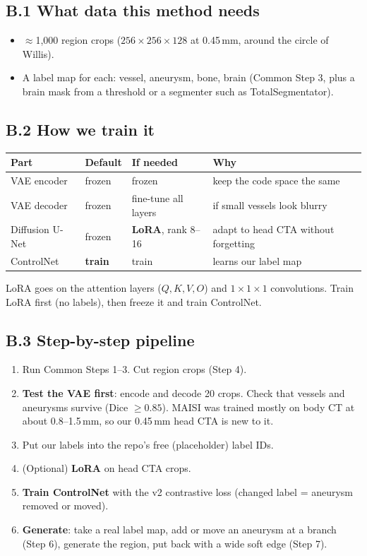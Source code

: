 \documentclass[11pt,a4paper,oneside]{report}
\begin{document}
\subsection*{B.1 What data this method needs}
\begin{itemize}
  \item $\approx$1{,}000 region crops ($256\times256\times128$ at 0.45\,mm, around the circle of Willis).
  \item A label map for each: vessel, aneurysm, bone, brain (Common Step 3, plus a brain mask from a threshold or a segmenter such as TotalSegmentator).
\end{itemize}

\subsection*{B.2 How we train it}
\begin{center}
\small
\begin{tabularx}{\linewidth}{lllX}
\toprule
\textbf{Part} & \textbf{Default} & \textbf{If needed} & \textbf{Why} \\
\midrule
VAE encoder & frozen & frozen & keep the code space the same \\
VAE decoder & frozen & fine-tune all layers & if small vessels look blurry \\
Diffusion U-Net & frozen & \textbf{LoRA}, rank 8--16 & adapt to head CTA without forgetting \\
ControlNet & \textbf{train} & train & learns our label map \\
\bottomrule
\end{tabularx}
\end{center}
LoRA goes on the attention layers ($Q,K,V,O$) and $1\times1\times1$ convolutions. Train LoRA first (no labels), then freeze it and train ControlNet.

\subsection*{B.3 Step-by-step pipeline}
\begin{enumerate}
  \item Run Common Steps 1--3. Cut region crops (Step 4).
  \item \textbf{Test the VAE first}: encode and decode 20 crops. Check that vessels and aneurysms survive (Dice $\ge0.85$). MAISI was trained mostly on body CT at about 0.8--1.5\,mm, so our 0.45\,mm head CTA is new to it.
  \item Put our labels into the repo's free (placeholder) label IDs.
  \item (Optional) \textbf{LoRA} on head CTA crops.
  \item \textbf{Train ControlNet} with the v2 contrastive loss (changed label = aneurysm removed or moved).
  \item \textbf{Generate}: take a real label map, add or move an aneurysm at a branch (Step 6), generate the region, put back with a wide soft edge (Step 7).
\end{enumerate}
\end{document}
